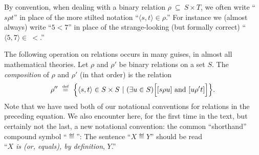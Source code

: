 By convention, when dealing with a binary relation $\rho \ \subseteq
\ S \times T$, we often write ``$s \rho t$'' in place of the more stilted notation
``$\langle s, t \rangle \in \rho$.''  For instance we (almost always)
write ``$5 < 7$'' in place of the strange-looking (but formally
correct) ``$\langle 5,7 \rangle \in \ <$.''

The following operation on relations occurs in many guises, in almost
all mathematical theories.  Let $\rho$ and $\rho'$ be binary relations
on a set $S$.  The {\it composition}
of $\rho$ and $\rho'$ (in that order) is the relation
\[ 
\rho'' \ \eqdef \ \Bigl\{ \langle s, t \rangle \in S \times S \ | \
(\exists u \in S) \Bigl[ [s \rho u] \mbox{ and } [u \rho' t] \Bigr] \Bigr\}.
\]
Note that we have used both of our notational conventions for
relations in the preceding equation.  We also encounter here, for the
first time in the text, but certainly not the last, a new notational
convention: the common ``shorthand'' compound symbol ``$\eqdef$'':
\index{$\eqdef$: ``equals, by definition''} The sentence ``$X \eqdef
Y$'' should be read \\
\hspace*{.25in}``$X$ {\em is (or, equals), by definition}, $Y$.''

\bigskip

\noindent {}
\bigskip


